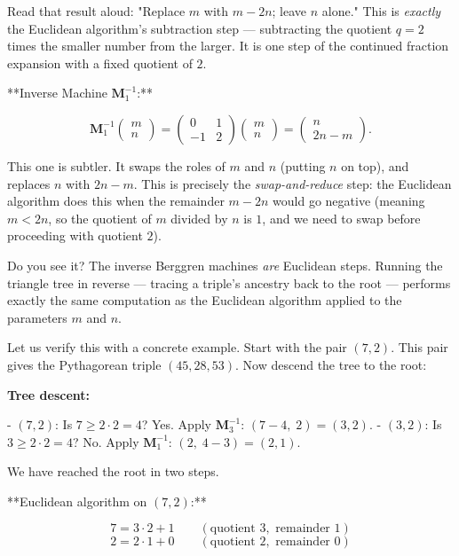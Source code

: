 Read that result aloud: "Replace $m$ with $m - 2n$; leave $n$ alone." This is \textit{exactly} the Euclidean algorithm's subtraction step --- subtracting the quotient $q = 2$ times the smaller number from the larger. It is one step of the continued fraction expansion with a fixed quotient of $2$.

**Inverse Machine $\mathbf{M}_1^{-1}$:**

\[
\mathbf{M}_1^{-1} \begin{pmatrix} m \\ n \end{pmatrix} = \begin{pmatrix} 0 & 1 \\ -1 & 2 \end{pmatrix} \begin{pmatrix} m \\ n \end{pmatrix} = \begin{pmatrix} n \\ 2n - m \end{pmatrix}.
\]

This one is subtler. It swaps the roles of $m$ and $n$ (putting $n$ on top), and replaces $n$ with $2n - m$. This is precisely the \textit{swap-and-reduce} step: the Euclidean algorithm does this when the remainder $m - 2n$ would go negative (meaning $m < 2n$, so the quotient of $m$ divided by $n$ is $1$, and we need to swap before proceeding with quotient $2$).

Do you see it? The inverse Berggren machines \textit{are} Euclidean steps. Running the triangle tree in reverse --- tracing a triple's ancestry back to the root --- performs exactly the same computation as the Euclidean algorithm applied to the parameters $m$ and $n$.

Let us verify this with a concrete example. Start with the pair $(7, 2)$. This pair gives the Pythagorean triple $(45, 28, 53)$. Now descend the tree to the root:

\textbf{Tree descent:}

- $(7, 2)$: Is $7 \ge 2 \cdot 2 = 4$? Yes. Apply $\mathbf{M}_3^{-1}$: $(7 - 4,\; 2) = (3, 2)$.
- $(3, 2)$: Is $3 \ge 2 \cdot 2 = 4$? No. Apply $\mathbf{M}_1^{-1}$: $(2,\; 4 - 3) = (2, 1)$.

We have reached the root in two steps.

**Euclidean algorithm on $(7, 2)$:**

\[
7 = 3 \cdot 2 + 1 \qquad (\text{quotient } 3, \text{ remainder } 1)
\]
\[
2 = 2 \cdot 1 + 0 \qquad (\text{quotient } 2, \text{ remainder } 0)
\]

